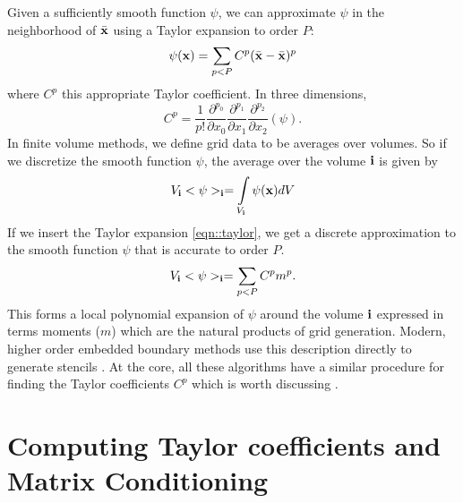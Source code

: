 \documentclass{article}
\newcommand{\ibold}{{\bf i}}
\newcommand{\xbold}{{\bf x}}
\newcommand{\xbar}{{\bar {\bf x}}}
\begin{document}
 
Given a sufficiently smooth function $\psi$, we can approximate $\psi$
in the neighborhood of $\xbar$ using a Taylor expansion to order $P$:
\begin{equation}
\psi(\xbold)  =  \sum\limits_{p < P} C^p (\xbar - \xbar)^p \label{eqn::taylor}
\end{equation}
where $C^p$ this appropriate Taylor coefficient.  In three dimensions,
\begin{equation}
  C^p =\frac{1}{p!}
      \frac{\partial^{p_0}}{\partial x_0}
      \frac{\partial^{p_1}}{\partial x_1}
      \frac{\partial^{p_2}}{\partial x_2}  (\psi).
\end{equation}  
In finite volume  methods, we define grid data to be
averages over volumes.   So if we discretize the smooth function
$\psi$, the average over the volume $\ibold$ is given by
\begin{equation*}
 V_\ibold <\psi>_\ibold = \int\limits_{V_\ibold} \psi(\xbold) dV
\end{equation*}
If we insert the Taylor expansion \ref{eqn::taylor}, we get a discrete
approximation to the smooth function $\psi$ that is accurate to order $P$.
\begin{equation*}
 V_\ibold <\psi>_\ibold = \sum\limits_{p < P} C^p m^p. 
\end{equation*}
This forms a local polynomial expansion of $\psi$ around the volume
$\ibold$ expressed in terms moments ($m$) which are the natural
products of grid generation.  Modern, higher order embedded boundary
methods use this description directly to generate stencils
\cite{Overton2022a, Devendran2017, Schwartz2015}.  At the
core, all these algorithms have a similar procedure for finding the
Taylor coefficients $C^p$ which is worth discussing \footnotemark[7].

\section{Computing Taylor coefficients and Matrix Conditioning}
\end{document}
